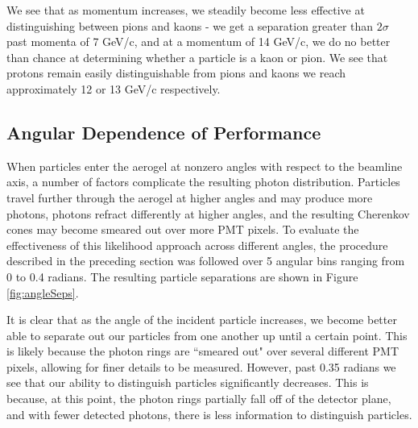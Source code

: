 We see that as momentum increases, we steadily become less effective at distinguishing between pions and kaons - we get a separation greater than $2 \sigma$ past momenta of 7 GeV/c, and at a momentum of 14 GeV/c, we do no better than chance at determining whether a particle is a kaon or pion.
We see that protons remain easily distinguishable from pions and kaons we reach approximately 12 or 13 GeV/c respectively. 

\subsection{Angular Dependence of Performance}
When particles enter the aerogel at nonzero angles with respect to the beamline axis, a number of factors complicate the resulting photon distribution. 
Particles travel further through the aerogel at higher angles and may produce more photons, photons refract differently at higher angles, and the resulting Cherenkov cones may become smeared out over more PMT pixels. 
To evaluate the effectiveness of this likelihood approach across different angles, the procedure described in the preceding section was followed over 5 angular bins ranging from 0 to 0.4 radians.
The resulting particle separations are shown in Figure \ref{fig:angleSeps}.

It is clear that as the angle of the incident particle increases, we become better able to separate out our particles from one another up until a certain point.
This is likely because the photon rings are ``smeared out" over several different PMT pixels, allowing for finer details to be measured. 
However, past 0.35 radians we see that our ability to distinguish particles significantly decreases.
This is because, at this point, the photon rings partially fall off of the detector plane, and with fewer detected photons, there is less information to distinguish particles.

